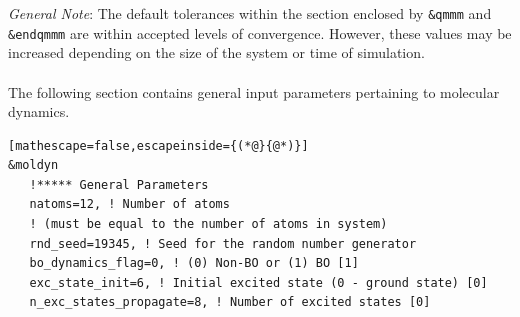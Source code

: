 \documentclass[letterpaper,12pt,titlepage]{article}
\begin{document}
\textit{General Note}: The default tolerances within the section enclosed by \verb+&qmmm+ and \verb+&endqmmm+ are within accepted levels of convergence.  However, these values may be increased depending on the size of the system or time of simulation.
\\
\\
The following section contains general input parameters pertaining to molecular dynamics.
\begin{lstlisting}[mathescape=false,escapeinside={(*@}{@*)}]
&moldyn
   !***** General Parameters
   natoms=12, ! Number of atoms 
   ! (must be equal to the number of atoms in system)
   rnd_seed=19345, ! Seed for the random number generator
   bo_dynamics_flag=0, ! (0) Non-BO or (1) BO [1]
   exc_state_init=6, ! Initial excited state (0 - ground state) [0]
   n_exc_states_propagate=8, ! Number of excited states [0]
\end{lstlisting}
\end{document}
